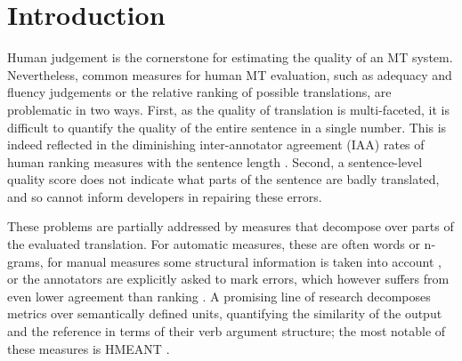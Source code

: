 \documentclass[11pt,letterpaper]{article}
\def\parcite#1{\cite{#1}}
\begin{document}
\begin{abstract}

\end{abstract}


\section{Introduction}\label{sec:intro}

Human judgement is the cornerstone for estimating the quality of an MT system.
Nevertheless, common measures for human MT evaluation, such as adequacy and fluency judgements
or the relative ranking of possible translations, are problematic in two ways.
First, as the quality of translation is multi-faceted, it is difficult
to quantify the quality of the entire sentence in a single number. This
is indeed reflected in the diminishing inter-annotator agreement (IAA) rates of human ranking measures
with the sentence length \cite{Bojar:2011}.
Second, a sentence-level quality score does not indicate what parts of the sentence
are badly translated, and so cannot inform developers in repairing these errors.

These problems are partially addressed by measures that decompose over parts of the evaluated
translation. For automatic measures,
these are often words or n-grams, for manual measures some structural
information is taken into account \parcite{machacek:bojar:segranks:2015}, or the
annotators are explicitly asked to mark errors, which however suffers from even
lower agreement than ranking \parcite{lommel:etal:mqm-iaa:2014}.
A promising line of research decomposes metrics
over semantically defined units,
quantifying the similarity of the output and the reference in terms of
their verb argument structure; the most notable of these measures is HMEANT
\parcite{lo2011structured}.
\end{document}
